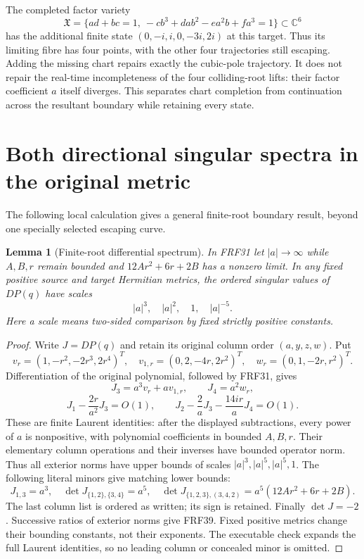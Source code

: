 \documentclass[11pt]{article}
\newtheorem{lemma}[theorem]{Lemma}
\newcommand{\C}{\mathbb C}
\begin{document}
The completed factor variety
\[
 \mathfrak X=\{ad+bc=1,\ -cb^3+dab^2-ea^2b+fa^3=1\}\subset\C^6
\]
has the additional finite state $(0,-i,i,0,-3i,2i)$ at this target.
Thus its limiting fibre has four points, with the other four trajectories
still escaping. Adding the missing chart repairs exactly the cubic-pole
trajectory. It does not repair the real-time incompleteness of the four
colliding-root lifts: their factor coefficient $a$ itself diverges.
This separates chart completion from continuation across the resultant
boundary while retaining every state.

\section{Both directional singular spectra in the original metric}
The following local calculation gives a general finite-root boundary
result, beyond one specially selected escaping curve.

\begin{lemma}[Finite-root differential spectrum]\label{lem:spectrum}
In FRF31 let $|a|\to\infty$ while $A,B,r$ remain bounded and
$12Ar^2+6r+2B$ has a nonzero limit. In any fixed positive source and
target Hermitian metrics, the ordered singular values of $DP(q)$ have
scales
\[
 |a|^3,\quad |a|^2,\quad 1,\quad |a|^{-5}.\tag{FRF39}
\]
Here a scale means two-sided comparison by fixed strictly positive constants.
\end{lemma}
\begin{proof}
Write $J=DP(q)$ and retain its original column order $(a,y,z,w)$. Put
\[
 v_r=(1,-r^2,-2r^3,2r^4)^T,\quad
 v_{1,r}=(0,2,-4r,2r^2)^T,\quad
 w_r=(0,1,-2r,r^2)^T.
\]
Differentiation of the original polynomial, followed by FRF31, gives
\[
 J_3=a^3v_r+a v_{1,r},\qquad J_4=a^2w_r,\tag{FRF40}
\]
\[
 J_1-\frac{2r}{a^2}J_3=O(1),\qquad
 J_2-\frac2aJ_3-\frac{14ir}{a}J_4=O(1).\tag{FRF41}
\]
These are finite Laurent identities: after the displayed subtractions,
every power of $a$ is nonpositive, with polynomial coefficients in bounded
$A,B,r$. Their elementary column operations and their inverses have bounded
operator norm. Thus all exterior norms have upper bounds of scales
$|a|^3,|a|^5,|a|^5,1$.
The following literal minors give matching lower bounds:
\[
 J_{1,3}=a^3,\quad
 \det J_{\{1,2\},\{3,4\}}=a^5,\quad
 \det J_{\{1,2,3\},(3,4,2)}=a^5(12Ar^2+6r+2B).\tag{FRF42}
\]
The last column list is ordered as written; its sign is retained.
Finally $\det J=-2$. Successive ratios of exterior norms give FRF39.
Fixed positive metrics change their bounding constants, not their exponents.
The executable check expands the full Laurent identities, so no leading
column or concealed minor is omitted.
\end{proof}
\end{document}
